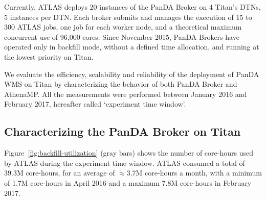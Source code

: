 Currently, ATLAS deploys 20 instances of the PanDA Broker on 4 Titan's DTNs, 5
instances per DTN. Each broker submits and manages the execution of 15 to 300
ATLAS jobs, one job for each worker node, and a theoretical maximum concurrent
use of 96,000 cores. Since November 2015, PanDA Brokers have operated only in
backfill mode, without a defined time allocation, and running at the lowest
priority on Titan.

We evaluate the efficiency, scalability and reliability of the deployment of
PanDA WMS on Titan by characterizing the behavior of both PanDA Broker and
AthenaMP. All the measurements were performed between January 2016 and February
2017, hereafter called `experiment time window'.




\subsection{Characterizing the PanDA Broker on Titan}
\label{ssec:panda_titan}


Figure~\ref{fig:backfill-utilization} (gray bars) shows the number of core-hours
used by ATLAS during the experiment time window. ATLAS consumed a total of 39.3M
core-hours, for an average of $\approx$3.7M core-hours a month, with a minimum
of 1.7M core-hours in April 2016 and a maximum 7.8M core-hours in February 2017.


